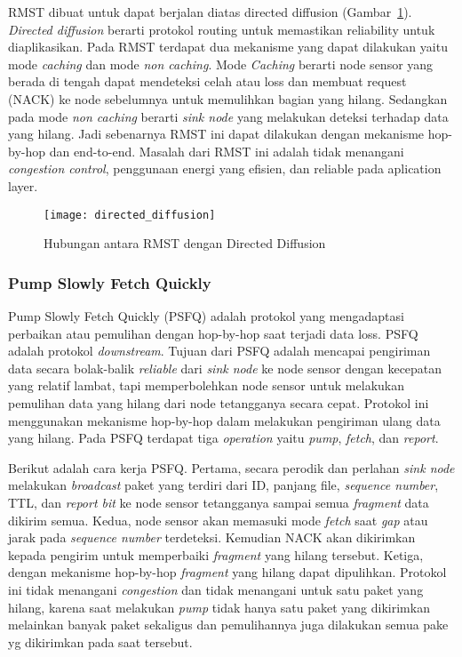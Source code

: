 RMST dibuat untuk dapat berjalan diatas directed diffusion (Gambar~\ref{fig:directed_diffusion}). \textit{Directed diffusion} berarti protokol routing untuk memastikan reliability untuk diaplikasikan. Pada RMST terdapat dua mekanisme yang dapat dilakukan yaitu mode \textit{caching} dan mode \textit{non caching}. Mode \textit{Caching} berarti node sensor yang berada di tengah dapat mendeteksi celah atau loss dan membuat request (NACK) ke node sebelumnya untuk memulihkan bagian yang hilang. Sedangkan pada mode \textit{non caching} berarti \textit{sink node} yang melakukan deteksi terhadap data yang hilang. Jadi sebenarnya RMST ini dapat dilakukan dengan mekanisme hop-by-hop dan end-to-end. Masalah dari RMST ini adalah tidak menangani \textit{congestion control}, penggunaan energi yang efisien, dan reliable pada aplication layer.
\begin{figure} [H]
	\centering  
	\texttt{[image: directed\_diffusion]}  
	\caption[Hubungan antara RMST dengan Directed Diffusion]{Hubungan antara RMST dengan Directed Diffusion} 
	\label{fig:directed_diffusion} 
\end{figure} 

\subsubsection{Pump Slowly Fetch Quickly}
Pump Slowly Fetch Quickly (PSFQ) adalah protokol yang mengadaptasi perbaikan atau pemulihan dengan hop-by-hop saat terjadi data loss. PSFQ adalah protokol \textit{downstream}. Tujuan dari PSFQ adalah mencapai pengiriman data secara bolak-balik  \textit{reliable} dari \textit{sink node} ke node sensor dengan kecepatan yang relatif lambat, tapi memperbolehkan node sensor untuk melakukan pemulihan data yang hilang dari node tetangganya secara cepat. Protokol ini menggunakan mekanisme hop-by-hop dalam melakukan pengiriman ulang data yang hilang. Pada PSFQ terdapat tiga \textit{operation} yaitu \textit{pump}, \textit{fetch}, dan \textit{report}. 

Berikut adalah cara kerja PSFQ. Pertama, secara perodik dan perlahan \textit{sink node} melakukan \textit{broadcast} paket yang terdiri dari ID, panjang file, \textit{sequence number}, TTL, dan \textit{report bit} ke node sensor tetangganya sampai semua \textit{fragment} data dikirim semua. Kedua, node sensor akan memasuki mode \textit{fetch} saat \textit{gap} atau jarak pada \textit{sequence number} terdeteksi. Kemudian NACK akan dikirimkan kepada pengirim untuk memperbaiki \textit{fragment} yang hilang tersebut. Ketiga, dengan mekanisme hop-by-hop \textit{fragment} yang hilang dapat dipulihkan. Protokol ini tidak menangani \textit{congestion} dan tidak menangani untuk satu paket yang hilang, karena saat melakukan \textit{pump} tidak hanya satu paket yang dikirimkan melainkan banyak paket sekaligus dan pemulihannya juga dilakukan semua pake yg dikirimkan pada saat tersebut.


